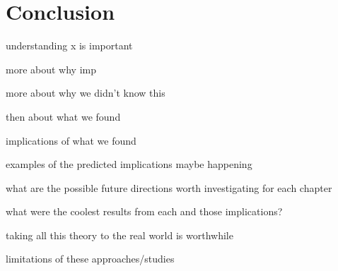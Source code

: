 \chapter{Conclusion}
\label{chap:conclusions}



understanding x is important

more about why imp

more about why we didn't know this

then about what we found

implications of what we found

examples of the predicted implications maybe happening

what are the possible future directions worth investigating for each chapter

what were the coolest results from each and those implications?

taking all this theory to the real world is worthwhile


limitations of these approaches/studies